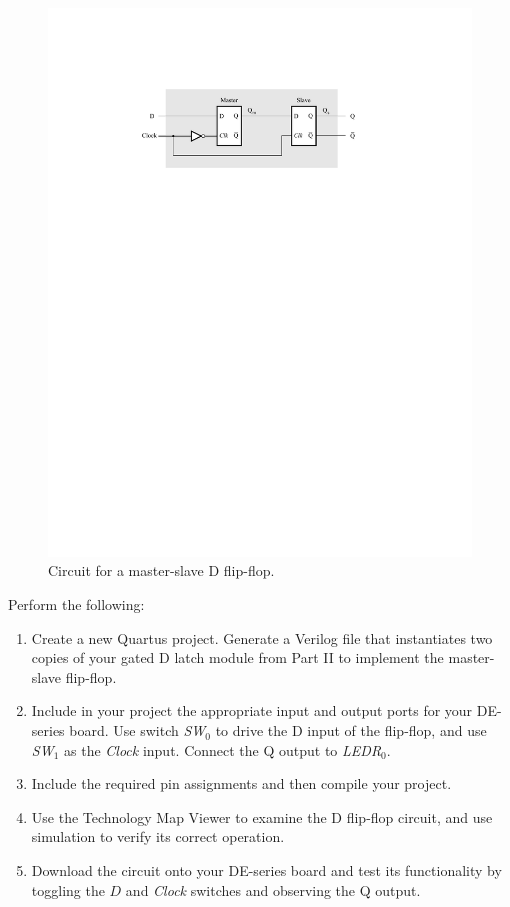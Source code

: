 \documentclass[epsfig,10pt,fullpage]{article}
\begin{document}
\begin{figure}[H]
	\begin{center}
		\includegraphics[]{figures/figure5.pdf}
	\end{center}
	\caption{Circuit for a master-slave D flip-flop.}
\label{fig:MS_FF}
\end{figure}

Perform the following:
\begin{enumerate}
\item Create a new Quartus project. Generate a Verilog file that instantiates two
copies of your gated D latch module from Part II to implement the master-slave flip-flop.
\item Include in your project the appropriate input and output ports for your
DE-series board. Use switch {\it SW}$_0$ to drive the D input of the flip-flop,
and use {\it SW}$_1$ as the {\it Clock} input. Connect the Q output to {\it LEDR}$_{0}$.
\item
Include the required pin assignments and then compile your project.
\item Use the Technology Map Viewer to examine the D flip-flop circuit, and use simulation to
verify its correct operation.
\item
Download the circuit onto your DE-series board and test its functionality 
by toggling the $D$ and {\it Clock} switches and observing the Q output.
\end{enumerate}
\end{document}
